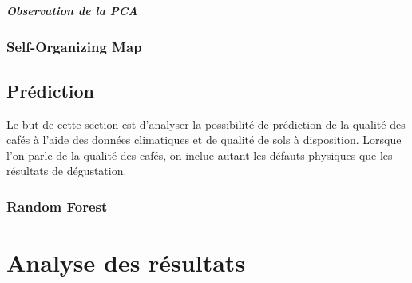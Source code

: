 \paragraph{Observation de la PCA }








\newpage
\subsection{Self-Organizing Map}










\section{Prédiction}
Le but de cette section est d'analyser la possibilité de prédiction de la qualité des cafés à l'aide des données climatiques et de qualité de sols à disposition. Lorsque l'on parle de la qualité des cafés, on inclue autant les défauts physiques que les résultats de dégustation. 



\subsection{Random Forest}



\chapter{Analyse des résultats}



